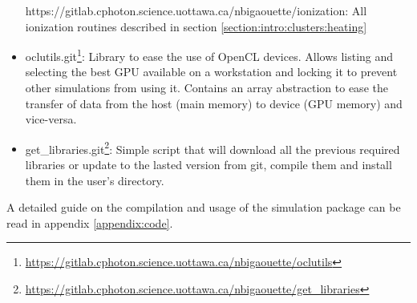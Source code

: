 \begin{itemize}
{{    https://gitlab.cphoton.science.uottawa.ca/nbigaouette/ionization}}:
    All ionization routines described in section
    \ref{section:intro:clusters:heating}
\item oclutils.git\footnote{ \url{
    https://gitlab.cphoton.science.uottawa.ca/nbigaouette/oclutils}}:
    Library to ease the use of OpenCL devices. Allows listing and selecting the
    best GPU available on a workstation and locking it to prevent
    other simulations from using it. Contains an array abstraction to ease the
    transfer of data from the host (main memory) to device (GPU memory) and
    vice-versa.
\item get\_libraries.git\footnote{ \url{
    https://gitlab.cphoton.science.uottawa.ca/nbigaouette/get_libraries}}:
    Simple script that will download all the previous required libraries or
    update to the lasted version from git, compile them and install them in the
    user's directory.
\end{itemize}
A detailed guide on the compilation and usage of the simulation package can be
read in appendix \ref{appendix:code}.

